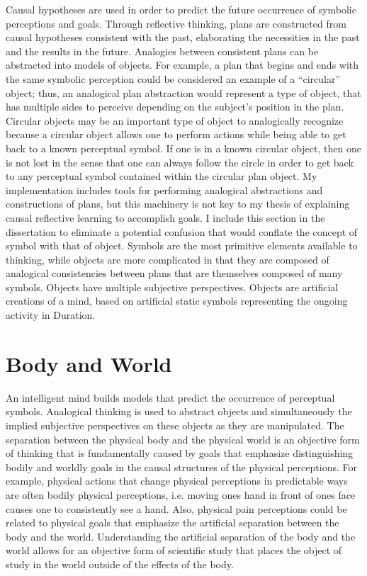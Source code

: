 Causal hypotheses are used in order to predict the future occurrence
of symbolic perceptions and goals.  Through reflective thinking, plans
are constructed from causal hypotheses consistent with the past,
elaborating the necessities in the past and the results in the future.
Analogies between consistent plans can be abstracted into models of
objects.  For example, a plan that begins and ends with the same
symbolic perception could be considered an example of a ``circular''
object; thus, an analogical plan abstraction would represent a type of
object, that has multiple sides to perceive depending on the subject's
position in the plan.  Circular objects may be an important type of
object to analogically recognize because a circular object allows one
to perform actions while being able to get back to a known perceptual
symbol.  If one is in a known circular object, then one is not lost in
the sense that one can always follow the circle in order to get back
to any perceptual symbol contained within the circular plan object.
My implementation includes tools for performing analogical
abstractions and constructions of plans, but this machinery is not key
to my thesis of explaining causal reflective learning to accomplish
goals.  I include this section in the dissertation to eliminate a
potential confusion that would conflate the concept of symbol with
that of object.  Symbols are the most primitive elements available to
thinking, while objects are more complicated in that they are composed
of analogical consistencies between plans that are themselves composed
of many symbols.  Objects have multiple subjective perspectives.
Objects are artificial creations of a mind, based on artificial static
symbols representing the ongoing activity in Duration.

\section{Body and World}

An intelligent mind builds models that predict the occurrence of
perceptual symbols.  Analogical thinking is used to abstract objects
and simultaneously the implied subjective perspectives on these
objects as they are manipulated.  The separation between the physical
body and the physical world is an objective form of thinking that is
fundamentally caused by goals that emphasize distinguishing bodily and
worldly goals in the causal structures of the physical perceptions.
For example, physical actions that change physical perceptions in
predictable ways are often bodily physical perceptions, i.e. moving
ones hand in front of ones face causes one to consistently see a hand.
Also, physical pain perceptions could be related to physical goals
that emphasize the artificial separation between the body and the
world.  Understanding the artificial separation of the body and the
world allows for an objective form of scientific study that places the
object of study in the world outside of the effects of the body.

